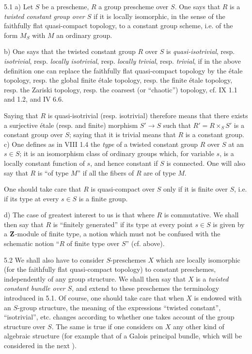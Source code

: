 \begin{definition}{5.1}\label{X.5.1}
a) Let $S$ be a prescheme, $R$ a group prescheme over $S$. One says that $R$ is a \emph{twisted constant group over $S$} if it is locally isomorphic, in the sense of the faithfully flat quasi-compact topology, to a constant group scheme, i.e. of the form $M_S$ with $M$ an ordinary group.

b) One says that the twisted constant group $R$ over $S$ is \emph{quasi-isotrivial}, resp. \emph{isotrivial}, resp. \emph{locally isotrivial}, resp. \emph{locally trivial}, resp. \emph{trivial}, if in the above definition one can replace the faithfully flat quasi-compact topology by the étale topology, resp. the global finite étale topology, resp. the finite étale topology, resp. the Zariski topology, resp. the coarsest (or ``chaotic'') topology, cf. IX 1.1 and 1.2, and IV 6.6.

Saying that $R$ is quasi-isotrivial (resp. isotrivial) therefore means that there exists a surjective étale (resp. and finite) morphism $S'\to S$ such that $R'=R\times_S S'$ is a constant group over $S$; saying that it is trivial means that $R$ is a constant group.
c) One defines as in VIII 1.4 the \emph{type} of a twisted constant group $R$ over $S$ at an $s\in S$; it is an isomorphism class of ordinary groups which, for variable $s$, is a locally constant function of $s$, and hence constant if $S$ is connected. One will also say that $R$ is ``of type $M$'' if all the fibers of $R$ are of type $M$.

One should take care that $R$ is quasi-compact over $S$ only if it is finite over $S$, i.e. if its type at every $s\in S$ is a finite group.

d) The case of greatest interest to us is that where $R$ is commutative. We shall then say that $R$ is ``finitely generated'' if its type at every point $s\in S$ is given by a $\mathbf{Z}$-module of finite type, a notion which must not be confused with the schematic notion ``$R$ of finite type over $S$'' (cf. above).
\end{definition}
\begin{remark}{5.2}\label{X.5.2}
We shall also have to consider $S$-preschemes $X$ which are locally isomorphic (for the faithfully flat quasi-compact topology) to constant preschemes, independently of any group structure. We shall then say that $X$ is a \emph{twisted constant bundle over $S$}, and extend to these preschemes the terminology introduced in 5.1. Of course, one should take care that when $X$ is endowed with an $S$-group structure, the meaning of the expressions ``twisted constant'', ``isotrivial'', etc. changes according to whether one takes account of the group structure over $S$. The same is true if one considers on $X$ any other kind of algebraic structure (for example that of a Galois principal bundle, which will be considered in the next \No).
\end{remark}
